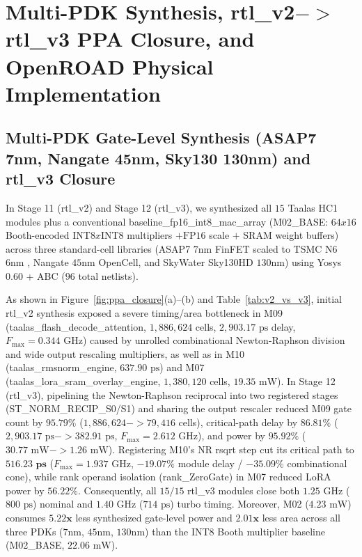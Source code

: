 \documentclass[10pt,journal,compsoc]{IEEEtran}
\def\texttt#1{#1}%
\def\textbf#1{#1}%
\def\to{->}%
\def\times{x}%
\begin{document}
\section{Multi-PDK Synthesis, \texttt{rtl\_v2}$\to$\texttt{rtl\_v3} PPA Closure, and OpenROAD Physical Implementation}
\subsection{Multi-PDK Gate-Level Synthesis (\texttt{ASAP7 7nm}, \texttt{Nangate 45nm}, \texttt{Sky130 130nm}) and \texttt{rtl\_v3} Closure}
In Stage 11 (\texttt{rtl\_v2}) and Stage 12 (\texttt{rtl\_v3}), we synthesized all $15$ Taalas HC1 modules plus a conventional \texttt{baseline\_fp16\_int8\_mac\_array} (\texttt{M02\_BASE}: $64\times 16$ Booth-encoded \texttt{INT8}$\times$\texttt{INT8} multipliers $+ \text{\texttt{FP16}}$ scale $+$ SRAM weight buffers) across three standard-cell libraries (\textbf{ASAP7 $7\text{nm}$ FinFET} scaled to TSMC N6 $6\text{nm}$ \cite{clark2016asap7}, \textbf{Nangate $45\text{nm}$ OpenCell}, and \textbf{SkyWater Sky130HD $130\text{nm}$}) using \texttt{Yosys 0.60 + ABC} ($96$ total netlists).

As shown in Figure~\ref{fig:ppa_closure}(a)--(b) and Table~\ref{tab:v2_vs_v3}, initial \texttt{rtl\_v2} synthesis exposed a severe timing/area bottleneck in \texttt{M09} (\texttt{taalas\_flash\_decode\_attention}, $1,886,624$ cells, $2,903.17\text{ ps}$ delay, $F_{\max}=0.344\text{ GHz}$) caused by unrolled combinational Newton-Raphson division and wide output rescaling multipliers, as well as in \texttt{M10} (\texttt{taalas\_rmsnorm\_engine}, $637.90\text{ ps}$) and \texttt{M07} (\texttt{taalas\_lora\_sram\_overlay\_engine}, $1,380,120$ cells, $19.35\text{ mW}$). In Stage 12 (\texttt{rtl\_v3}), pipelining the Newton-Raphson reciprocal into two registered stages (\texttt{ST\_NORM\_RECIP\_S0/S1}) and sharing the output rescaler reduced \texttt{M09} gate count by $\mathbf{95.79\%}$ ($1,886,624 \to 79,416$ cells), critical-path delay by $\mathbf{86.81\%}$ ($2,903.17\text{ ps} \to 382.91\text{ ps}$, $F_{\max}=2.612\text{ GHz}$), and power by $\mathbf{95.92\%}$ ($30.77\text{ mW} \to 1.26\text{ mW}$). Registering \texttt{M10}'s NR \texttt{rsqrt} step cut its critical path to $\mathbf{516.23\text{ ps}}$ ($F_{\max}=1.937\text{ GHz}$, $-19.07\%$ module delay / $-35.09\%$ combinational cone), while rank operand isolation (\texttt{rank\_ZeroGate}) in \texttt{M07} reduced LoRA power by $\mathbf{56.22\%}$. Consequently, \textbf{all $15/15$ \texttt{rtl\_v3} modules close both $1.25\text{ GHz}$ ($800\text{ ps}$) nominal and $1.40\text{ GHz}$ ($714\text{ ps}$) turbo timing}. Moreover, \texttt{M02} ($4.23\text{ mW}$) consumes $\mathbf{5.22\times}$ less synthesized gate-level power and $\mathbf{2.01\times}$ less area across all three PDKs ($7\text{nm}$, $45\text{nm}$, $130\text{nm}$) than the \texttt{INT8} Booth multiplier baseline (\texttt{M02\_BASE}, $22.06\text{ mW}$).
\end{document}
